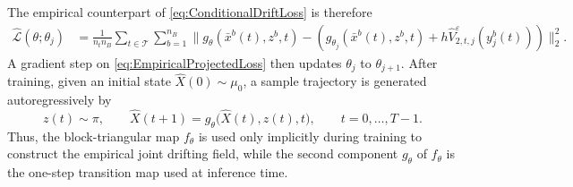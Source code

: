 \documentclass[oneside,11pt]{article}
\theoremstyle{remark}
\begin{document}
The empirical counterpart of
    \eqref{eq:ConditionalDriftLoss} is therefore
    \begin{align}
        \widehat{\mathcal L}(\theta;\theta_j)
        &=
        \frac{1}{n_t n_B}
        \sum_{t\in\mathcal T}
        \sum_{b=1}^{n_B}
        \Bigg\|
            g_\theta(\bar x^b(t),z^b,t)
            -
               \left( g_{\theta_j}(\bar x^b(t),z^b,t)
                +
                h\widehat V_{2,t,j}^{\varepsilon}
                (y_{j}^b(t))\right)
        \Bigg\|_2^2.
        \label{eq:EmpiricalProjectedLoss}
    \end{align}
     A gradient step on
    \eqref{eq:EmpiricalProjectedLoss} then updates $\theta_j$ to
    $\theta_{j+1}$.
After training, given an initial state $\widehat X(0)\sim\mu_0$, a sample
    trajectory is generated autoregressively by
\begin{equation}\label{eq:AutoregressiveSampling}
        z(t)\sim\pi,
        \qquad
        \widehat X(t+1)
        =
        g_{\theta}
        \big(
            \widehat X(t),z(t),t
        \big),
        \qquad
        t=0,\ldots,T-1.
    \end{equation}
    Thus, the block-triangular map $f_\theta$ is used only implicitly during training to
    construct the empirical joint drifting field, while the second component
    $g_\theta$ of $f_{\theta}$ is the one-step transition map used at inference time.

\newcommand{\pmc}[2]{#1{(\pm#2)}}
\end{document}
